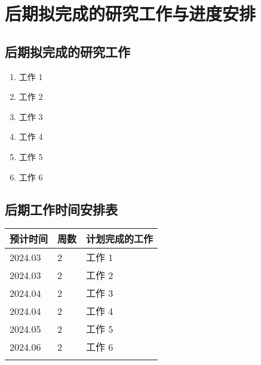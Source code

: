 \chapter{后期拟完成的研究工作与进度安排}\label{ch:future_work}

\section{后期拟完成的研究工作}
    \begin{enumerate}
        \item 工作 1
        \item 工作 2
        \item 工作 3
        \item 工作 4
        \item 工作 5
        \item 工作 6
    \end{enumerate}

\section{后期工作时间安排表}
    \begin{table}[htbp]
        \centering
        \vspace{0.5em}\wuhao
        \begin{tabularx}{\textwidth}{llX}
        \toprule[1.5pt]
        预计时间 & 周数 & 计划完成的工作 \\
        \midrule[1pt]
        2024.03 & 2 & 工作 1 \\
        2024.03 & 2 & 工作 2 \\
        2024.04 & 2 & 工作 3 \\
        2024.04 & 2 & 工作 4 \\
        2024.05 & 2 & 工作 5 \\
        2024.06 & 2 & 工作 6 \\
        \bottomrule[1.5pt]
        \label{tab:futureschedule}
        \end{tabularx}
    \end{table}



